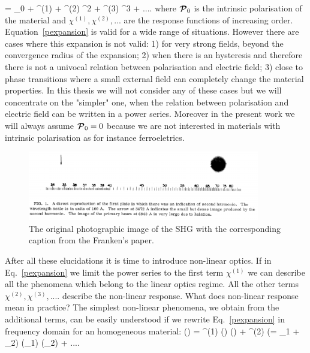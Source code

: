\be
\PPc = \PPc_0 + \chi^{(1)} \EEc + \chi^{(2)} \EEc^2 + \chi^{(3)} \EEc^3 + ....
\label{pexpansion}
\ee
where ${\boldsymbol {\cal P}}_0$ is the intrinsic polarisation of the material and  $\chi^{(1)}, \chi^{(2)},...$ are the response functions of increasing order. Equation~\ref{pexpansion} is valid for a wide range of situations. However there are cases where this expansion is not valid: 1) for very strong fields, beyond the convergence radius of the expansion\cite{lee2014first}; 2) when there is an hysteresis and therefore there is not a univocal relation between polarisation and electric field; 3) close to phase transitions where a small external field can completely change the material properties. In this thesis we will not consider any of these cases but we will concentrate on the "simpler" one, when the relation between polarisation and electric field can be written in a power series. Moreover in the present work we will always assume ${\boldsymbol {\cal P}}_0=0$ because we are not interested in materials with intrinsic polarisation as for instance ferroeletrics.\\
\begin{figure}[ht]
  \begin{center}
    \includegraphics[width=0.9\textwidth]{Figures/SHG_franken.png}
  \end{center}        
  \caption{The original photographic image of the SHG with the corresponding caption from the Franken's paper\cite{franken1961generation}. \label{frankenfig}} %
\end{figure}
After all these elucidations it is time to introduce non-linear optics. If in Eq.~\ref{pexpansion} we limit the power series to the first term $\chi^{(1)}$ we can describe all the phenomena which belong to the linear optics regime. All the other terms  $\chi^{(2)}, \chi^{(3)},.... $  describe the non-linear response. What does non-linear response mean in practice?  The simplest non-linear phenomena, we obtain from the additional terms,  can be easily understood if we rewrite Eq.~\ref{pexpansion} in frequency domain for an homogeneous material:
\be
\PPc(\omega) = \chi^{(1)} (\omega) \EEc(\omega)  + \chi^{(2)} (\omega = \omega_1 + \omega_2) \EEc(\omega_1) \EEc(\omega_2) + ....
